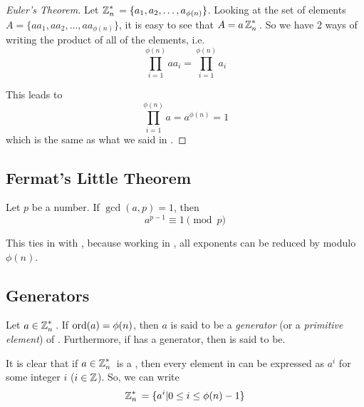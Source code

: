 \begin{proof}[Euler's Theorem]\label{proof:Eulers_Theorem}
  Let $\operatorname{\mathbb{Z}}_{n}^{*}{} = \lbrace a_{1}, a_{2}, \ldots, a_{\phi(n)} \rbrace$.
  Looking at the set of elements $A = \lbrace aa_{1}, aa_{2}, \ldots, aa_{\phi(n)} \rbrace$, it is easy to see that $A = a \operatorname{\mathbb{Z}}_{n}^{*}{}$.
  So we have 2 ways of writing the product of all of the elements, i.e.
  \begin{equation*}
    \prod\limits_{i=1}^{\phi(n)} a a_{i} = \prod\limits_{i=1}^{\phi(n)} a_{i}
  \end{equation*}
  
  This leads to
  \begin{equation*}
    \prod\limits_{i=1}^{\phi(n)} a = a^{\phi(n)} = 1
  \end{equation*}
  which is the same as what we said in .
\end{proof}

\subsection{Fermat's Little Theorem}\label{subsec:Fermats_Little_Theorem}
\begin{theorem}\label{thm:Fermats_Little_Theorem}
  Let $p$ be a  number.
  If $\gcd(a, p) = 1$, then
  \begin{equation}\label{eq:Fermats_Little_Theorem}
    a^{p-1} \equiv 1 \pmod{p}
  \end{equation}
\end{theorem}
\begin{remark*}
  This ties in with , because working in \TextIntsModN{}, all exponents can be reduced by modulo $\phi(n)$.
\end{remark*}

\subsection{Generators}\label{subsec:Generators}
\begin{definition}[Generator]\label{def:Generator}
  Let $a \in \operatorname{\mathbb{Z}}_{n}^{*}{}$.
  If $\operatorname{\text{ord}}(a) = \phi(n)$, then $a$ is said to be a \emph{generator} (or a \emph{primitive element}) of \TextMultiplicativeGroupN{}.
  Furthermore, if \TextMultiplicativeGroupN{} has a generator, then \TextMultiplicativeGroupN{} is said to be\emph{}.
  \begin{remark}
    It is clear that if $a \in \operatorname{\mathbb{Z}}_{n}^{*}{}$ is a , then every element in \TextMultiplicativeGroupN{} can be expressed as $a^{i}$ for some integer $i$ ($i \in \operatorname{\mathbb{Z}}$).
    So, we can write
    \begin{equation}\label{eq:Generator_in_Multiplicative_Group}
      \operatorname{\mathbb{Z}}_{n}^{*}{} = \lbrace a^{i} \vert 0 \leq i \leq \phi(n) - 1 \rbrace
    \end{equation}
  \end{remark}
\end{definition}

